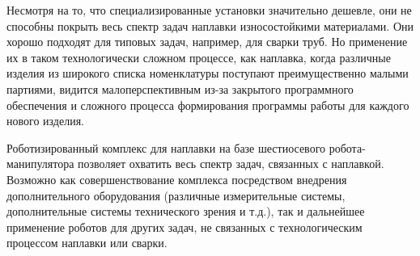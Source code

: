 Несмотря на то, что специализированные установки значительно дешевле, они не способны покрыть весь спектр задач наплавки износостойкими материалами.
Они хорошо подходят для типовых задач, например, для сварки труб.
Но применение их в таком технологически сложном процессе, как наплавка, когда различные изделия из широкого списка номенклатуры поступают преимущественно малыми партиями, видится малоперспективным из-за закрытого программного обеспечения и сложного процесса формирования программы работы для каждого нового изделия.

Роботизированный комплекс для наплавки на базе шестиосевого робота-манипулятора позволяет охватить весь спектр задач, связанных с наплавкой.
Возможно как совершенствование комплекса посредством внедрения дополнительного оборудования (различные измерительные системы, дополнительные системы технического зрения и т.д.), так и дальнейшее применение роботов для других задач, не связанных с технологическим процессом наплавки или сварки.
